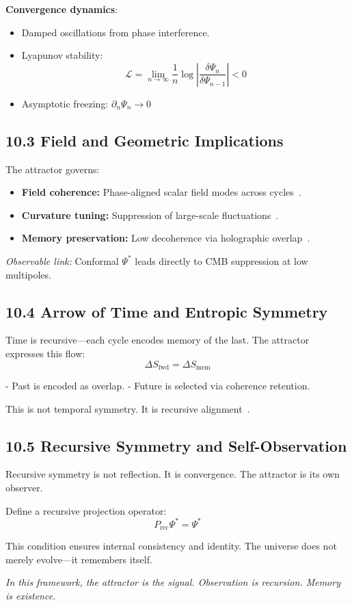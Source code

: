 \textbf{Convergence dynamics}:
\begin{itemize}
  \item Damped oscillations from phase interference.
  \item Lyapunov stability:
  \[
  \mathcal{L} = \lim_{n \to \infty} \frac{1}{n} \log \left| \frac{\delta \Psi_n}{\delta \Psi_{n-1}} \right| < 0
  \]
  \item Asymptotic freezing: \( \partial_n \Psi_n \to 0 \)
\end{itemize}

\subsection*{10.3 Field and Geometric Implications}

The attractor governs:
\begin{itemize}
  \item \textbf{Field coherence:} Phase-aligned scalar field modes across cycles~\cite{ashtekar2006quantum}.
  \item \textbf{Curvature tuning:} Suppression of large-scale fluctuations~\cite{planck2019inflation}.
  \item \textbf{Memory preservation:} Low decoherence via holographic overlap~\cite{zurek2003decoherence}.
\end{itemize}

\textit{Observable link:} Conformal \( \Psi^* \) leads directly to CMB suppression at low multipoles.

\subsection*{10.4 Arrow of Time and Entropic Symmetry}

Time is recursive—each cycle encodes memory of the last. The attractor expresses this flow:
\[
\Delta S_{\text{fwd}} = \Delta S_{\text{mem}}
\]

- Past is encoded as overlap.
- Future is selected via coherence retention.

This is not temporal symmetry. It is recursive alignment~\cite{hartle1990time}.

\subsection*{10.5 Recursive Symmetry and Self-Observation}

Recursive symmetry is not reflection. It is convergence. The attractor is its own observer.

Define a recursive projection operator:
\[
P_{\text{rec}} \Psi^* = \Psi^*
\]

This condition ensures internal consistency and identity. The universe does not merely evolve—it remembers itself.

\textit{In this framework, the attractor is the signal. Observation is recursion. Memory is existence.}

